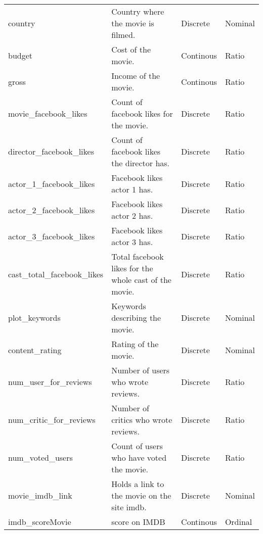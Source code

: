 \documentclass[11pt]{article}
\begin{document}
\begin{sidewaystable}
\begin{tabular}{llll}
country                      & Country where the movie is filmed.                    & Discrete                    & Nominal                    \\
budget                       & Cost of the movie.                                    & Continous                   & Ratio                      \\
gross                        & Income of the movie.                                  & Continous                   & Ratio                      \\
movie\_facebook\_likes       & Count of facebook likes for the movie.                & Discrete                    & Ratio                      \\
director\_facebook\_likes    & Count of facebook likes the director has.             & Discrete                    & Ratio                      \\
actor\_1\_facebook\_likes    & Facebook likes actor 1 has.                           & Discrete                    & Ratio                      \\
actor\_2\_facebook\_likes    & Facebook likes actor 2 has.                           & Discrete                    & Ratio                      \\
actor\_3\_facebook\_likes    & Facebook likes actor 3 has.                           & Discrete                    & Ratio                      \\
cast\_total\_facebook\_likes & Total facebook likes for the whole cast of the movie. & Discrete                    & Ratio                      \\
plot\_keywords               & Keywords describing the movie.                        & Discrete                    & Nominal                    \\
content\_rating              & Rating of the movie.                                  & Discrete                    & Nominal                    \\
num\_user\_for\_reviews      & Number of users who wrote reviews.                    & Discrete                    & Ratio                      \\
num\_critic\_for\_reviews    & Number of critics who wrote reviews.                  & Discrete                    & Ratio                      \\
num\_voted\_users            & Count of users who have voted the movie.              & Discrete                    & Ratio                      \\
movie\_imdb\_link            & Holds a link to the movie on the site imdb.           & Discrete                    & Nominal                    \\
imdb\_scoreMovie             & score on IMDB                                         & Continous                   & Ordinal                   
\end{tabular}
\end{sidewaystable}
\end{document}
